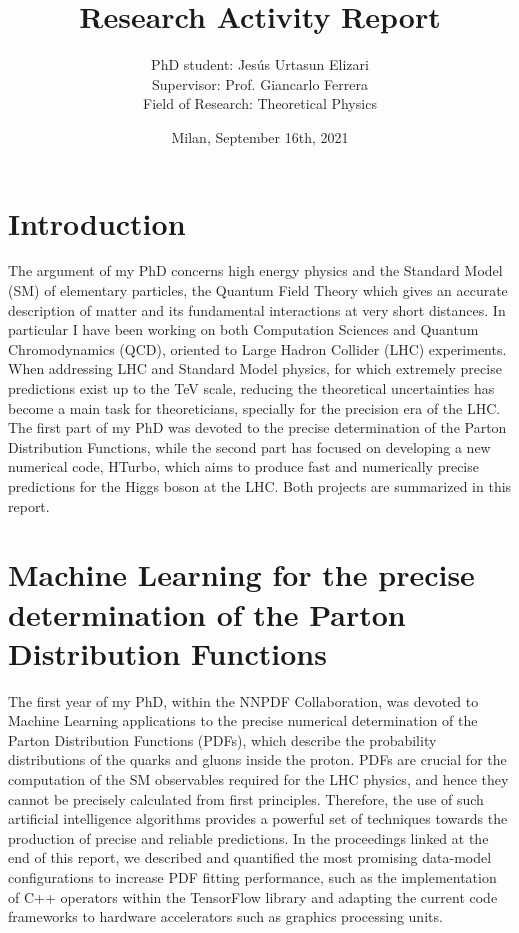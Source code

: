 \documentclass[12pt]{article}
\begin{document}
	
\title{Research Activity Report}
\author{PhD student: Jes\'us Urtasun Elizari \\
		Supervisor: Prof. Giancarlo Ferrera \\
		Field of Research: Theoretical Physics}
\date{Milan, September 16th, 2021}
\maketitle

\section{Introduction}

The argument of my PhD concerns high energy physics and the Standard Model (SM) of elementary particles, the Quantum Field Theory which gives an accurate description of
matter and its fundamental interactions at very short distances. In particular I have been working on both Computation Sciences and Quantum Chromodynamics (QCD), oriented to Large Hadron Collider (LHC) experiments. When addressing LHC and Standard Model physics, for which extremely precise predictions exist up to the TeV scale, reducing the theoretical uncertainties has become a main task for theoreticians, specially for the precision era of the LHC. The first part of my PhD was devoted to the precise determination of the Parton Distribution Functions, while the second part has focused on developing a new numerical code, HTurbo, which aims to produce fast and numerically precise predictions for the Higgs boson at the LHC. Both projects are summarized in this report.\\

\section{Machine Learning for the precise determination of the Parton Distribution Functions}

The first year of my PhD, within the NNPDF Collaboration, was devoted to Machine Learning applications to the precise numerical determination of the Parton Distribution Functions (PDFs), which describe the probability distributions of the quarks and gluons inside the proton. PDFs are crucial for the computation of the SM observables required for the LHC physics, and hence they cannot be precisely calculated from first principles. Therefore, the use of such artificial intelligence algorithms provides a powerful set of techniques towards the production of precise and reliable predictions. In the proceedings linked at the end of this report, we described and quantified the most promising data-model configurations to increase PDF fitting performance, such as the implementation of C++ operators within the TensorFlow library and adapting the current code frameworks to hardware accelerators such as graphics processing units.\\
\end{document}
